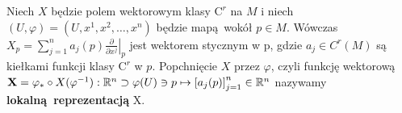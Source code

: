 %




Niech \(X\) będzie polem wektorowym klasy \(\mathrm{C}^r\) na \(M\) i niech \((U, \varphi) = (U, x^1, x^2, \dots, x^n)\) będzie mapą wokół \(p\in M\). Wówczas \(X_p = \sum_{j=1}^{n}a_j(p)\left.\frac{\partial}{\partial x^j}\right|_p\) jest wektorem stycznym w p, gdzie \(a_j\in C^r(M)\) są kiełkami funkcji klasy \(\mathrm{C}^r\) w \(p\). Popchnięcie \(X\) przez \(\varphi\), czyli funkcję wektorową \(\mathbf{X} = \varphi_{\ast}\circ X(\varphi^{-1}): \mathbb{R}^n \supset \varphi(U)\ni p \mapsto \left[a_j(p)\right]_{j=1}^n\in \mathbb{R}^n\) nazywamy \textbf{lokalną reprezentacją} X.

